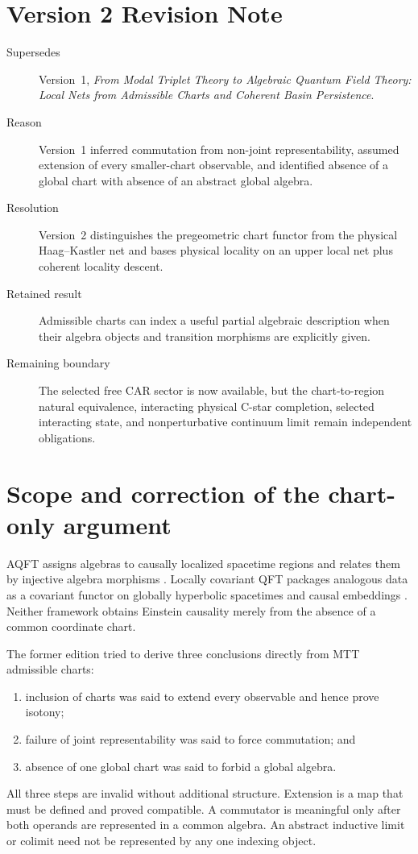 \documentclass[11pt]{article}
\begin{document}
\section*{Version 2 Revision Note}
\begin{description}
\item[Supersedes] Version~1, \emph{From Modal Triplet Theory to Algebraic
Quantum Field Theory: Local Nets from Admissible Charts and Coherent Basin
Persistence}.
\item[Reason] Version~1 inferred commutation from non-joint
representability, assumed extension of every smaller-chart observable, and
identified absence of a global chart with absence of an abstract global
algebra.
\item[Resolution] Version~2 distinguishes the pregeometric chart functor from
the physical Haag--Kastler net and bases physical locality on an upper local
net plus coherent locality descent.
\item[Retained result] Admissible charts can index a useful partial algebraic
description when their algebra objects and transition morphisms are explicitly
given.
\item[Remaining boundary] The selected free CAR sector is now available, but
the chart-to-region natural equivalence, interacting physical C-star
completion, selected interacting state, and nonperturbative continuum limit
remain independent obligations.
\end{description}

\tableofcontents

\section{Scope and correction of the chart-only argument}

AQFT assigns algebras to causally localized spacetime regions and relates them
by injective algebra morphisms \cite{HaagKastler1964}.  Locally covariant QFT
packages analogous data as a covariant functor on globally hyperbolic
spacetimes and causal embeddings \cite{BFV2003}.  Neither framework obtains
Einstein causality merely from the absence of a common coordinate chart.

The former edition tried to derive three conclusions directly from MTT
admissible charts:
\begin{enumerate}
\item inclusion of charts was said to extend every observable and hence prove
isotony;
\item failure of joint representability was said to force commutation; and
\item absence of one global chart was said to forbid a global algebra.
\end{enumerate}
All three steps are invalid without additional structure.  Extension is a
map that must be defined and proved compatible.  A commutator is meaningful
only after both operands are represented in a common algebra.  An abstract
inductive limit or colimit need not be represented by any one indexing
object.
\end{document}
